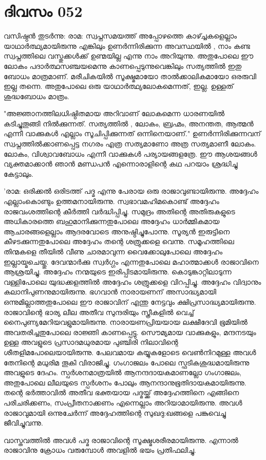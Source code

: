 \newpage
\section{ദിവസം 052}


വസിഷ്ഠന്‍ തുടര്‍ന്നു: രാമ: സ്വപ്നസമയത്ത്‌ അപ്പോഴത്തെ കാഴ്ച്ചകളെല്ലാം യാഥാര്‍ത്ഥ്യമായിരുന്നു എങ്കിലും ഉണര്‍ന്നിരിക്കുന്ന അവസ്ഥയില്‍ , നാം കണ്ട സ്വപ്നത്തിലെ വസ്തുക്കള്‍ക്ക്‌ ഉണ്മയില്ല എന്നു നാം അറിയുന്നു. അതുപോലെ ഈ ലോകം പദാര്‍ത്ഥസഞ്ചയമെന്നു കാണപ്പെടുന്നുവെങ്കിലും സത്യത്തില്‍ ഇതു ബോധം മാത്രമാണ്‌. മരീചികയില്‍ സൂക്ഷ്മമായോ താല്‍ക്കാലികമായോ ഒരരുവി ഇല്ല തന്നെ. അതുപോലെ ഒരു യാഥാര്‍ത്ഥ്യലോകമെന്നത്‌, ഇല്ല. ഉള്ളത്‌ ശുദ്ധബോധം മാത്രം.

"അജ്ഞാനത്തിലധിഷ്ഠിതമായ അറിവാണ്‌ ലോകമെന്ന ധാരണയില്‍ കടിച്ചുതൂങ്ങി നില്‍ക്കുന്നത്‌. സത്യത്തില്‍ , ലോകം, ബ്രഹ്മം, അനന്തത, ആത്മന്‍ എന്നീ വാക്കുകള്‍ എല്ലാം സൂചിപ്പിക്കുന്നത്‌ ഒന്നിനെയാണ്‌."  ഉണര്‍ന്നിരിക്കുന്നവന്‌ സ്വപ്നത്തില്‍ക്കാണപ്പെട്ട നഗരം എത്ര സത്യമാണോ അത്ര സത്യമാണീ ലോകം. ലോകം, വിശ്വാവബോധം എന്നീ വാക്കുകള്‍ പര്യായങ്ങളത്രേ. ഈ ആശയങ്ങള്‍ വ്യക്തമാക്കാന്‍ ഞാന്‍ മണ്ഡപന്‍ എന്നൊരാളിന്റെ കഥ പറയാം ശ്രദ്ധിച്ചു കേട്ടാലും.

'രാമ: ഒരിക്കല്‍ ഒരിടത്ത്‌ പദ്മ എന്നു പേരായ ഒരു രാജാവുണ്ടായിരുന്നു. അദ്ദേഹം എല്ലാംകൊണ്ടും ഉത്തമനായിരുന്നു. സ്വഭാവമഹിമകൊണ്ട്‌ അദ്ദേഹം രാജവംശത്തിന്റെ കീര്‍ത്തി വര്‍ദ്ധിപ്പിച്ചു. സമുദ്രം അതിന്റെ അതിരുകളുടെ അധികാരത്തെ ബഹുമാനിക്കുന്നതുപോലെ അദ്ദേഹം ധാര്‍മ്മികമായ ആചാരങ്ങളെല്ലാം ആദരവോടെ അനുഷ്ഠിച്ചുപോന്നു. സൂര്യന്‍ ഇരുട്ടിനെ കീഴടക്കുന്നതുപോലെ അദ്ദേഹം തന്റെ ശത്രുക്കളെ വെന്നു. സമൂഹത്തിലെ തിന്മകളെ തീയില്‍ വീണു ചാരമാവുന്ന വൈക്കോലുപോലെ അദ്ദേഹം ഇല്ലായ്മചെയ്തു. ദേവന്മാര്‍ക്കു സ്വര്‍ഗ്ഗം എന്നതുപോലെ മഹാത്മാക്കള്‍ രാജാവിനെ ആശ്രയിച്ചു. അദ്ദേഹം നന്മയുടെ ഇരിപ്പിടമായിരുന്നു. കൊടുങ്കാറ്റിലാടുന്ന വള്ളിപോലെ യുദ്ധക്കളത്തില്‍ അദ്ദേഹം ശത്രുക്കളെ വിറപ്പിച്ചു. അദ്ദേഹം വിദ്വാനും കലാനിപുണനുമായിരുന്നു. ഭഗവാന്‍ നാരായണന്‌ അസാദ്ധ്യമായി ഒന്നുമില്ലാത്തതുപോലെ ഈ രാജാവിന്‌ എന്തു നേട്ടവും ക്ഷിപ്രസാദ്ധ്യമായിരുന്നു. രാജാവിന്റെ ഭാര്യ ലീല അതീവ സുന്ദരിയും സ്ത്രീകളില്‍ വെച്ച്‌ നൈപുണ്യമേറിയവളുമായിരുന്നു. നാരായണപ്രിയയായ ലക്ഷീദേവി ഭൂമിയില്‍ അവതരിച്ചതുപോലെ രാജ്ഞി കാണപ്പെട്ടു. സൌമ്യമായ വാക്കുകളും, മന്ദനടയും ഉള്ള അവളുടെ പ്രസാദമധുരമായ പുഞ്ചിരി നിലാവിന്റെ ശീതളിമപോലെയായിരുന്നു. പേലവമായ കയ്യുകളോടെ വെണ്‍നിറമുള്ള അവള്‍ തേനിന്റെ മധുരിമ തൂകി വിരാജിച്ചു. ഗംഗാജലം പോലെ സ്ഫടികശുദ്ധമായിരുന്നു അവളുടെ ദേഹം. സ്പര്‍ശനമാത്രയില്‍ ആനന്ദദായകമാണല്ലോ ഗംഗാജലം, അതുപോലെ ലീലയുടെ സ്പര്‍ശനം പോലും ആനന്ദാനുഭൂതിദായകമായിരുന്നു. തന്റെ ഭര്‍ത്താവില്‍ അതീവ ഭക്തയായ പദ്മയ്ക്ക്‌ അദ്ദേഹത്തിനെ എങ്ങിനെ പരിചരിക്കണം, സംപ്രീതനാക്കണം എന്നെല്ലാം അറിയാമായിരുന്നു. അവള്‍ രാജാവുമായി ഒന്നുചേര്‍ന്ന് അദ്ദേഹത്തിന്റെ സുഖദു:ഖങ്ങളെ പങ്കുവെച്ചു ജീവിച്ചുവന്നു. 

വാസ്തവത്തില്‍ അവള്‍ പദ്മ രാജാവിന്റെ സൂക്ഷ്മശരീരമായിരുന്നു. എന്നാല്‍ രാജാവിനു ക്രോധം വരുമ്പോള്‍ അവളില്‍ ഭയം പ്രതിഫലിച്ചു.
